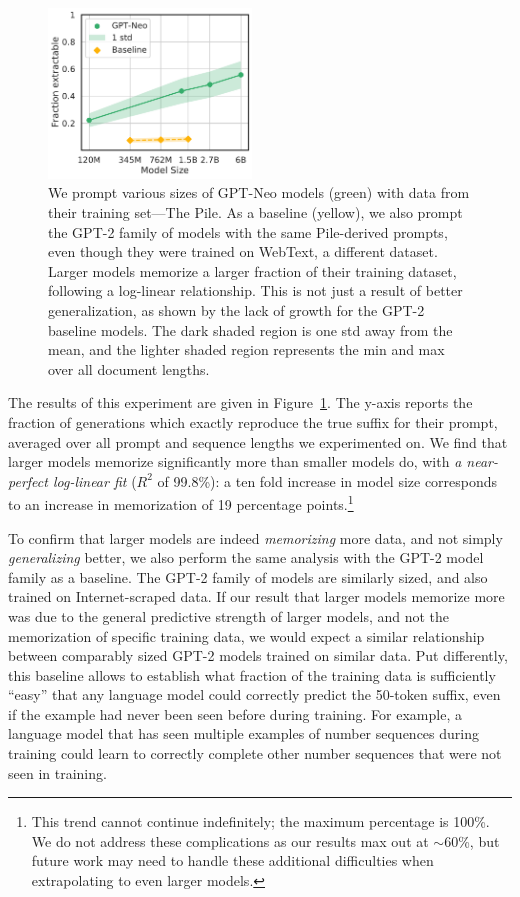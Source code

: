 \begin{figure}[h]
    \includegraphics[height=12.2em]{figures/exactly_mem-vs-model_size-prompt-all-gen-50-xlabel-ylabel.pdf} %
    \centering
    \caption{We prompt various sizes of GPT-Neo models (green) with data from their training set---The Pile. 
As a baseline (yellow), we also prompt the GPT-2 family of models with the same Pile-derived prompts, even though they were trained on WebText, a different dataset.
Larger models memorize a larger fraction of their training dataset, following a log-linear relationship.
This is not just a result of better generalization, as shown by the lack of growth for the GPT-2 baseline models.
The dark shaded region is one std away from the mean, and the lighter shaded region represents the min and max over all document lengths.
}
\label{fig:main-res-size}
\end{figure}

The results of this experiment are given in Figure~\ref{fig:main-res-size}.
%
The y-axis reports the fraction of generations which exactly reproduce the true suffix for their prompt, averaged over all prompt and sequence lengths we experimented on.
%
We find that larger models memorize significantly more than smaller models do, with \emph{a near-perfect log-linear fit} ($R^2$ of 99.8\%): a ten fold increase in model size corresponds to an increase in memorization of 19 percentage points.\footnote{This trend cannot continue indefinitely; the maximum percentage is 100\%.
We do not address these complications as our results max out at $\sim$60\%, but future work may need to handle these additional difficulties when extrapolating to even larger models.}

To confirm that larger models are indeed \emph{memorizing} more data, and not simply \emph{generalizing} better, we also perform the same analysis with the GPT-2 model family as a baseline. 
%
The GPT-2 family of models are similarly sized, and also trained on Internet-scraped data.
If our result that larger models memorize more was due to the general predictive strength of larger models, and not the memorization of specific training data, we would expect a similar relationship between comparably sized GPT-2 models trained on similar data. 
%
Put differently, this baseline allows to establish
what fraction of the training data is sufficiently ``easy'' that any language model could correctly
predict the 50-token suffix, even if the example had never been seen before during training.
For example, a language model that has seen multiple examples of number sequences during training could learn to correctly complete other number sequences that were not seen in training.
%
%

